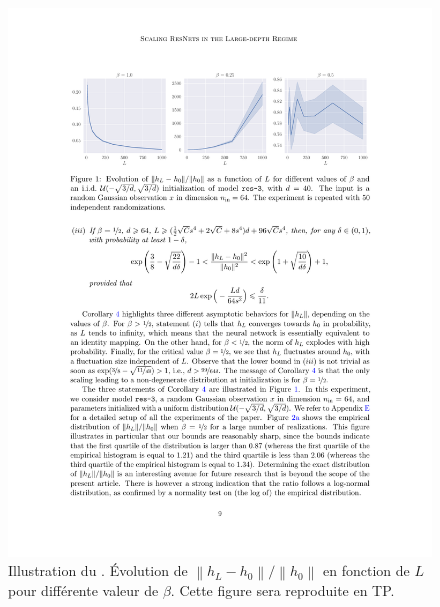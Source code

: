 \begin{figure}[H]
    \centering
    \includegraphics[width=.95\textwidth]{figs/figure_cor4.pdf}
    \caption{Illustration du . Évolution de $ \left\| h_L - h_0 \right\| / \left\| h_0 \right\| $ en fonction de $ L $ pour différente valeur de $ \beta  $. Cette figure sera reproduite en TP.}
    \label{fig:cor4}
\end{figure}
